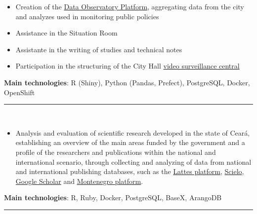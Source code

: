 \documentclass[10pt,a4paper,ragged2e,withhyper]{altacv}
\begin{document}
\begin{paracol}{2}



\begin{itemize}
\item Creation of the \href{https://observatoriodefortaleza.fortaleza.ce.gov.br/dados/}{Data Observatory Platform}, aggregating data from the city and analyzes used in monitoring public policies
\item Assistance in the Situation Room
\item Assistante in the writing of studies and technical notes
\item Participation in the structuring of the City Hall \href{https://www.fortaleza.ce.gov.br/noticias/fortaleza-cidade-inteligente-prefeitura-anuncia-central-integrada-e-politica-publica-de-videomonitoramento}{video surveillance central}
\end{itemize}

\textbf{Main technologies}: R (Shiny), Python (Pandas, Prefect), PostgreSQL, Docker, OpenShift
\\{\textcolor{body!30}{\rule{\linewidth}{0.5pt}}\\}

\begin{itemize}
\item Analysis and evaluation of scientific research developed in the state of Ceará, establishing an overview of the main areas funded by the government and a profile of the researchers and publications within the national and international scenario, through collecting and analyzing of data from national and international publishing databases, such as the \href{https://lattes.cnpq.br/}{Lattes platform}, \href{https://www.scielo.br}{Scielo}, \href{https://scholar.google.com.br/}{Google Scholar} and \href{http://montenegro.funcap.ce.gov.br/sugba/}{Montenegro platform}.
\end{itemize}

\textbf{Main technologies}: R, Ruby, Docker, PostgreSQL, BaseX, ArangoDB
\\{\textcolor{body!30}{\rule{\linewidth}{0.5pt}}\\}


\end{paracol}
\end{document}
